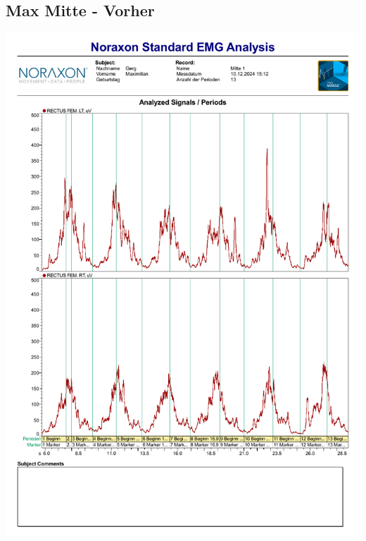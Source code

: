 \subsection*{Max Mitte - Vorher}
\includegraphics[width=.9\textwidth]{img/pdfs/Maxi_Mitte_1.pdf}
\clearpage

